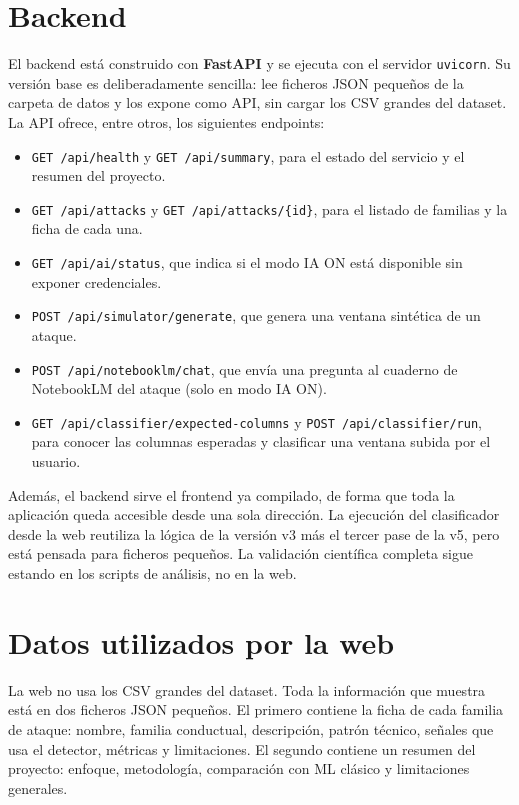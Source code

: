 \section{Backend}
\label{sec:web_backend}

El backend está construido con \textbf{FastAPI} y se ejecuta con el servidor \texttt{uvicorn}. Su versión base es deliberadamente sencilla: lee ficheros JSON pequeños de la carpeta de datos y los expone como API, sin cargar los CSV grandes del dataset. La API ofrece, entre otros, los siguientes endpoints:

\begin{itemize}
  \item \texttt{GET /api/health} y \texttt{GET /api/summary}, para el estado del servicio y el resumen del proyecto.
  \item \texttt{GET /api/attacks} y \texttt{GET /api/attacks/\{id\}}, para el listado de familias y la ficha de cada una.
  \item \texttt{GET /api/ai/status}, que indica si el modo IA ON está disponible sin exponer credenciales.
  \item \texttt{POST /api/simulator/generate}, que genera una ventana sintética de un ataque.
  \item \texttt{POST /api/notebooklm/chat}, que envía una pregunta al cuaderno de NotebookLM del ataque (solo en modo IA ON).
  \item \texttt{GET /api/classifier/expected-columns} y \texttt{POST /api/classifier/run}, para conocer las columnas esperadas y clasificar una ventana subida por el usuario.
\end{itemize}

Además, el backend sirve el frontend ya compilado, de forma que toda la aplicación queda accesible desde una sola dirección. La ejecución del clasificador desde la web reutiliza la lógica de la versión v3 más el tercer pase de la v5, pero está pensada para ficheros pequeños. La validación científica completa sigue estando en los scripts de análisis, no en la web.

\section{Datos utilizados por la web}
\label{sec:web_datos}

La web no usa los CSV grandes del dataset. Toda la información que muestra está en dos ficheros JSON pequeños. El primero contiene la ficha de cada familia de ataque: nombre, familia conductual, descripción, patrón técnico, señales que usa el detector, métricas y limitaciones. El segundo contiene un resumen del proyecto: enfoque, metodología, comparación con ML clásico y limitaciones generales.

